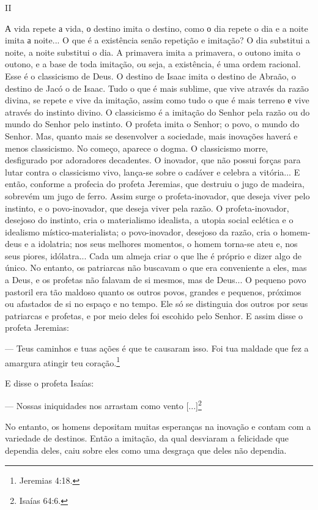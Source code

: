 II

А vida repete а vida, о destino imita o destino, como о dia repete o dia
e a noite imita а noite... O que é a existência senão repetição e
imitação? O dia substitui a noite, a noite substitui o dia. A primavera
imita a primavera, o outono imita o outono, e a base de toda imitação,
ou seja, a existência, é uma ordem racional. Esse é o classicismo de
Deus. O destino de Isaac imita o destino de Abraão, o destino de Jacó o
de Isaac. Tudo o que é mais sublime, que vive através da razão divina,
se repete e vive da imitação, assim como tudo o que é mais terreno е
vive através do instinto divino. O classicismo é a imitação do Senhor
pela razão ou do mundo do Senhor pelo instinto. O profeta imita o
Senhor; o povo, o mundo do Senhor. Mas, quanto mais se desenvolver a
sociedade, mais inovações haverá e menos classicismo. No começo, aparece
o dogma. O classicismo morre, desfigurado por adoradores decadentes. O
inovador, que não possui forças para lutar contra o classicismo vivo,
lança-se sobre o cadáver e celebra a vitória... E então, conforme a
profecia do profeta Jeremias, que destruiu o jugo de madeira, sobrevém
um jugo de ferro. Assim surge o profeta-inovador, que deseja viver pelo
instinto, e o povo-inovador, que deseja viver pela razão. O
profeta-inovador, desejoso do instinto, cria o materialismo idealista, a
utopia social eclética e o idealismo místico-materialista; o
povo-inovador, desejoso da razão, cria o homem-deus e a idolatria; nos
seus melhores momentos, o homem torna-se ateu e, nos seus piores,
idólatra... Cada um almeja criar o que lhe é próprio e dizer algo de
único. No entanto, os patriarcas não buscavam o que era conveniente a
eles, mas a Deus, e os profetas não falavam de si mesmos, mas de Deus...
O pequeno povo pastoril era tão maldoso quanto os outros povos, grandes
e pequenos, próximos ou afastados de si no espaço e no tempo. Ele só se
distinguia dos outros por seus patriarcas e profetas, e por meio deles
foi escohido pelo Senhor. E assim disse o profeta Jeremias:

--- Teus caminhos e tuas ações é que te causaram isso. Foi tua maldade
que fez a amargura atingir teu coração.\footnote{Jeremias 4:18.}

E disse o profeta Isaías:

--- Nossas iniquidades nos arrastam como vento {[}...{]}\footnote{Isaías
  64:6.}

No entanto, os homens depositam muitas esperanças na inovação e contam
com a variedade de destinos. Então a imitação, da qual desviaram a
felicidade que dependia deles, caiu sobre eles como uma desgraça que
deles não dependia.

